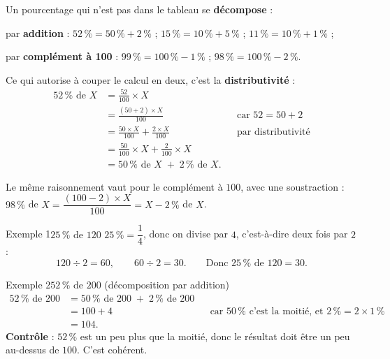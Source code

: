 \begin{astuce}
Un pourcentage qui n'est pas dans le tableau se \textbf{décompose} :
\begin{compactitem}
\item par \textbf{addition} : $52\,\% = 50\,\% + 2\,\%$ ; $15\,\% = 10\,\% + 5\,\%$ ;
      $11\,\% = 10\,\% + 1\,\%$ ;
\item par \textbf{complément à 100} : $99\,\% = 100\,\% - 1\,\%$ ;
      $98\,\% = 100\,\% - 2\,\%$.
\end{compactitem}
\end{astuce}

\begin{theorie}
Ce qui autorise à couper le calcul en deux, c'est la \textbf{distributivité} :
\begin{align*}
  52\,\% \text{ de } X &= \frac{52}{100} \times X \\
                       &= \frac{(50 + 2) \times X}{100}          &&\text{car } 52 = 50 + 2 \\
                       &= \frac{50 \times X}{100} + \frac{2 \times X}{100}
                                                                 &&\text{par distributivité} \\
                       &= \frac{50}{100} \times X + \frac{2}{100} \times X \\
                       &= 50\,\% \text{ de } X \;+\; 2\,\% \text{ de } X.
\end{align*}

Le même raisonnement vaut pour le complément à $100$, avec une soustraction :
$98\,\%$ de $X = \dfrac{(100 - 2) \times X}{100} = X - 2\,\%$ de $X$.
\end{theorie}

\begin{exemple}{Exemple 1}{$25\,\%$ de $120$}
$25\,\% = \dfrac{1}{4}$, donc on divise par $4$, c'est-à-dire deux fois par $2$ :
\[ 120 \div 2 = 60, \qquad 60 \div 2 = 30. \qquad\text{Donc } 25\,\% \text{ de } 120 = 30. \]
\end{exemple}

\begin{exemple}{Exemple 2}{$52\,\%$ de $200$ (décomposition par addition)}
\begin{align*}
  52\,\% \text{ de } 200 &= 50\,\% \text{ de } 200 \;+\; 2\,\% \text{ de } 200 \\
                         &= 100 + 4 &&\text{car } 50\,\% \text{ c'est la moitié, et } 2\,\% = 2 \times 1\,\% \\
                         &= 104.
\end{align*}
\textbf{Contrôle} : $52\,\%$ est un peu plus que la moitié, donc le résultat doit être
un peu au-dessus de $100$. C'est cohérent.
\end{exemple}

